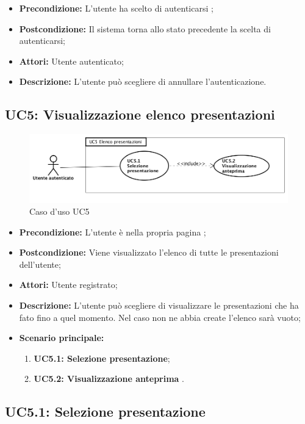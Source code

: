 \begin{itemize}
	\item \textbf{Precondizione:} L'utente ha scelto di autenticarsi ;
	\item \textbf{Postcondizione:} Il sistema torna allo stato precedente la scelta di autenticarsi;
	\item \textbf{Attori:} Utente autenticato;
	\item \textbf{Descrizione:} L'utente può scegliere di annullare l'autenticazione.
\end{itemize}
\subsection{ UC5: Visualizzazione elenco presentazioni}

\begin{figure}[h]
	\begin{center}
	\includegraphics[scale=0.4]{diagram/UC5.png}
	\caption{Caso d'uso UC5}
	\end{center}
\end{figure}
\begin{itemize}
	\item \textbf{Precondizione:} L'utente è nella propria pagina ;
	\item \textbf{Postcondizione:} Viene visualizzato l'elenco di tutte le presentazioni dell'utente;
	\item \textbf{Attori:} Utente registrato;
	\item \textbf{Descrizione:} L'utente può scegliere di visualizzare le presentazioni che ha fato fino a quel momento. Nel caso non ne abbia create l'elenco sarà vuoto;
	\item \textbf{Scenario principale:}
	\begin{enumerate}
		\item \textbf{ UC5.1: Selezione presentazione};
		\item \textbf{ UC5.2: Visualizzazione anteprima }.
	\end{enumerate}
\end{itemize}
\subsection{ UC5.1: Selezione presentazione}

